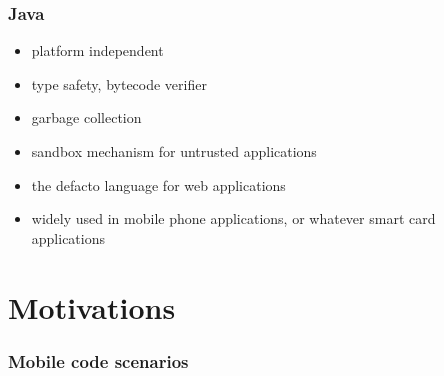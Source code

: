 \documentclass{beamer}
\begin{document}
\begin{frame}[shrink]
\frametitle{Java}
\begin{itemize}
  \item platform independent
  \item type safety,  bytecode verifier
    \item garbage collection
     
       \item sandbox mechanism for untrusted applications %

\end{itemize}

\begin{itemize}
  \item the defacto language for web applications
  \item widely used in mobile phone applications, or whatever smart card applications
\end{itemize}
\end{frame}

\section{Motivations}


\begin{frame}
\frametitle{Mobile code scenarios}
\begin{figure}[ht!]
\begin{center}
\end{center}
\end{figure} 
\end{frame}
\end{document}
